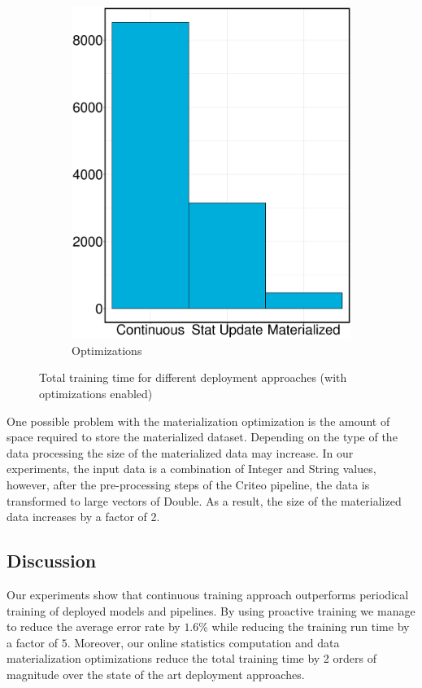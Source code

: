 \begin{figure}[h]
\begin{subfigure}{\columnwidth/2}
\includegraphics[width=\columnwidth]{../images/experiment-results/criteo-training-time-optimizations-experiment.eps}
\caption{Optimizations}
\label{fig:training-time-optimization}
\end{subfigure}
\vspace{2mm}
\caption{Total training time for different deployment approaches (with optimizations enabled)}
\end{figure}

One possible problem with the materialization optimization is the amount of space required to store the materialized dataset.
Depending on the type of the data processing the size of the materialized data may increase.
In our experiments, the input data is a combination of Integer and String values, however, after the pre-processing steps of the Criteo pipeline, the data is transformed to large vectors of Double.
As a result, the size of the materialized data increases by a factor of 2.


\subsection{Discussion} \label{subsec:discussion}
Our experiments show that continuous training approach outperforms periodical training of deployed models and pipelines.
By using proactive training we manage to reduce the average error rate by $1.6\%$ while reducing the training run time by a factor of $5$.
Moreover, our online statistics computation and data materialization optimizations reduce the total training time by 2 orders of magnitude over the state of the art deployment approaches.


